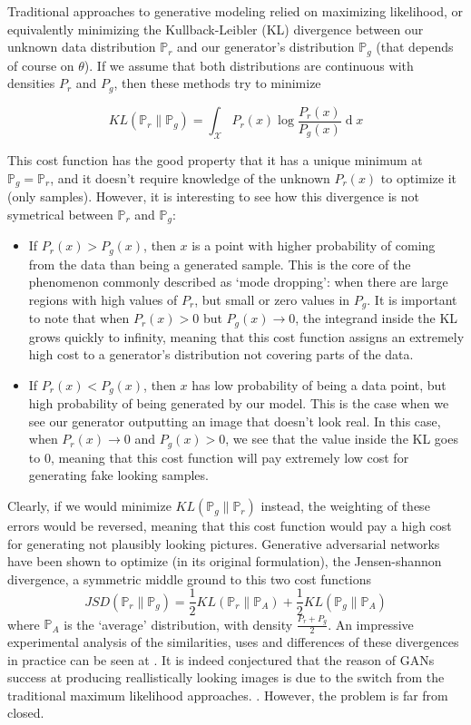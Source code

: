\documentclass{article} %
\newcommand\PP{\mathbb{P}}
\renewcommand{\d}[1]{\ensuremath{\operatorname{d}\!{#1}}}
\theoremstyle{definition}
\begin{document}
Traditional approaches to generative modeling relied on maximizing likelihood,
or equivalently minimizing the Kullback-Leibler (KL) divergence
between our unknown data distribution $\PP_r$ and our generator's distribution
$\PP_g$ (that depends of course on $\theta$). If we assume that both distributions
are continuous with densities $P_r$ and $P_g$, then these methods try to minimize

$$ KL(\PP_r \| \PP_g) = \int_{\mathcal{X}} P_r(x) \log\frac{P_r(x)}{P_g(x)} \d x $$

This cost function has the good property that it has a unique minimum at $\PP_g = \PP_r$,
and it doesn't require knowledge of the unknown $P_r(x)$ to optimize it (only samples). 
However, it is
interesting to see how this divergence is not symetrical between $\PP_r$ and $\PP_g$:
\begin{itemize}
  \item If $P_r(x) > P_g(x)$, then $x$ is a point with higher probability
of coming from the data than being a generated sample. This is the core of the 
phenomenon
commonly described as `mode dropping': when there are large regions with
high values of $P_r$, but small or zero values in $P_g$. It is important to note
that when $P_r(x) > 0$ but $P_g(x) \to 0$, the integrand inside the KL grows quickly
to infinity, meaning that this cost function assigns an extremely high cost to 
a generator's distribution not covering parts of the data.
  \item If $P_r(x) < P_g(x)$, then $x$ has low probability of being a data point,
but high probability of being generated by our model. This is the case when we see our generator
outputting an image that doesn't look real.
In this case, when $P_r(x) \to 0$ and $P_g(x) > 0$, we see that the value
inside the KL goes to 0, meaning that this cost function will pay extremely
low cost for generating fake looking samples.
\end{itemize}

Clearly, if we would minimize $KL(\PP_g \| \PP_r)$ instead, the weighting of these errors
would be reversed, meaning that this cost function would pay a high cost for
generating not plausibly looking pictures. Generative adversarial networks have been
shown to optimize (in its original formulation), the Jensen-shannon divergence,
a symmetric middle ground to this two cost functions
$$ JSD(\PP_r \| \PP_g) = \frac{1}{2} KL(\PP_r \| \PP_A) + \frac{1}{2} KL(\PP_g \| \PP_A) $$
where $\PP_A$ is the `average' distribution, with density $\frac{P_r + P_g}{2}$.
An impressive experimental analysis of the similarities, uses and differences of these
divergences in practice can be seen at \cite{Theis-ea-Gen}.
It is indeed conjectured that the reason of GANs success at producing reallistically
looking images is due to the switch from the traditional maximum likelihood approaches. 
\citep{Theis-ea-Gen, Ferenc15}. However, the problem is far from closed.
\end{document}
